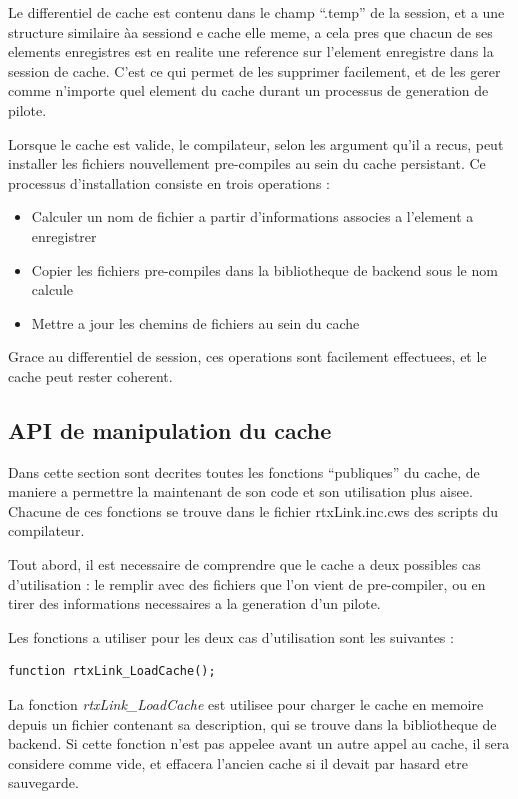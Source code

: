\documentclass[french]{rtxreport}
\begin{document}
\begin{enumerate}
Le differentiel de cache est contenu dans le champ ``.temp'' de la session, et
a une structure similaire àa sessiond e cache elle meme, a cela pres que chacun
de ses elements enregistres est en realite  une reference sur l'element
enregistre dans la session de cache. C'est ce qui permet de les supprimer
facilement, et de les gerer comme n'importe quel element du cache durant un
processus de generation de pilote.

Lorsque le cache est valide, le compilateur, selon les argument qu'il a recus,
peut installer les fichiers nouvellement pre-compiles au sein du cache
persistant. Ce processus d'installation consiste en trois operations :
\begin{itemize}
    \item Calculer un nom de fichier a partir d'informations associes a
        l'element a enregistrer
    \item Copier les fichiers pre-compiles dans la bibliotheque de backend sous
        le nom calcule
    \item Mettre a jour les chemins de fichiers au sein du cache
\end{itemize}

Grace au differentiel de session, ces operations sont facilement effectuees, et
le cache peut rester coherent.


\subsection{API de manipulation du cache}

Dans cette section sont decrites toutes les fonctions ``publiques'' du cache,
de maniere a permettre la maintenant de son code et son utilisation plus aisee.
Chacune de ces fonctions se trouve dans le fichier rtxLink.inc.cws des scripts
du compilateur.

Tout abord, il est necessaire de comprendre que le cache a deux possibles cas
d'utilisation : le remplir avec des fichiers que l'on vient de pre-compiler, ou
en tirer des informations necessaires a la generation d'un pilote.

\vspace{}

Les fonctions a utiliser pour les deux cas d'utilisation sont les suivantes :

\begin{lstlisting}
function rtxLink_LoadCache();
\end{lstlisting}
La fonction \emph{rtxLink\_LoadCache} est utilisee pour charger le cache en
memoire depuis un fichier contenant sa description, qui se trouve dans la
bibliotheque de backend. Si cette fonction n'est pas appelee avant un autre
appel au cache, il sera considere comme vide, et effacera l'ancien cache si il
devait par hasard etre sauvegarde.


\end{enumerate}
\end{document}
